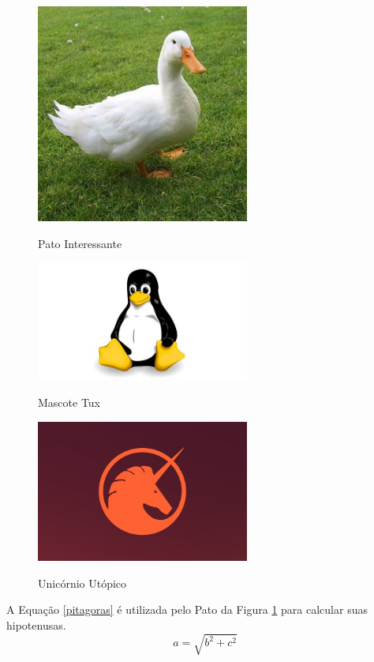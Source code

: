 \documentclass[article,brazilian,11pt]{abntex2}
\begin{document}
\begin{figure}[h]
\center
\caption{Pato Interessante}
\includegraphics[width=7cm]{pato}
\label{pato}
\end{figure}

\begin{figure}[h]
\center
\caption{Mascote Tux}
\includegraphics[width=7cm]{tux}
\label{tux}
\end{figure}

\begin{figure}[h]
\center
\caption{Unicórnio Utópico}
\includegraphics[width=7cm]{unicorn}
\label{unicornio}
\end{figure}

A Equação \ref{pitagoras} é utilizada pelo Pato da Figura \ref{pato} para calcular suas hipotenusas.
\begin{equation}
a = \sqrt{b^2 + c^2}
\label{pitagoras}
\end{equation}
\end{document}
